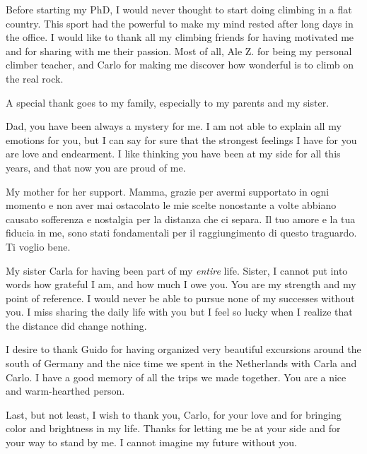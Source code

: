 Before starting my PhD, I would never thought to start doing climbing in a flat country. This sport had the powerful to make my mind rested after long days in the office.
I would like to thank all my climbing friends for having motivated me and for sharing with me their passion. Most of all, Ale Z. for being my personal climber teacher, and Carlo for making me discover how wonderful is to climb on the real rock. 

A special thank goes to my family, especially to my parents and my sister.

Dad, you have been always a mystery for me. I am not able to explain all my emotions for you, but I can say for sure that the strongest feelings I have for you are love and endearment. I like thinking you have been at my side for all this years, and that now you are proud of me.

My mother for her support. Mamma, grazie per avermi supportato in ogni momento e non aver mai ostacolato le mie scelte nonostante a volte abbiano causato sofferenza e nostalgia per la distanza che ci separa. Il tuo amore e la tua fiducia in me, sono stati fondamentali per il raggiungimento di questo traguardo. Ti voglio bene.   

My sister Carla for having been part of my \textit{entire} life. Sister, I cannot put into words how grateful I am, and how much I owe you. You are my strength and my point of reference. I would never be able to pursue none of my successes without you.
I miss sharing the daily life with you but I feel so lucky when I realize that the distance did change nothing. 

I desire to thank Guido for having organized very beautiful excursions around the south of Germany and the nice time we spent in the Netherlands with Carla and Carlo. I have a good memory of all the trips we made together. You are a nice and warm-hearthed person.

Last, but not least, I wish to thank you, Carlo, for your love and for bringing color and brightness in my life.
Thanks for letting me be at your side and for your way to stand by me. I cannot imagine my future without you.
\clearpage{\pagestyle{empty}\cleardoublepage}
